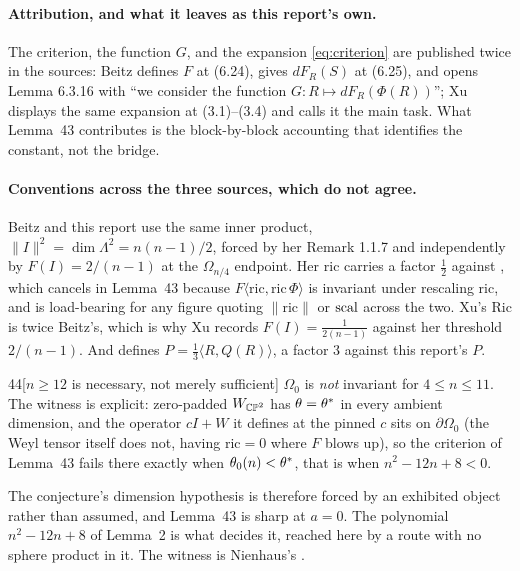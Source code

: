 \paragraph{Attribution, and what it leaves as this report's own.} The criterion, the function $G$, and the expansion \eqref{eq:criterion} are published twice in the sources: Beitz defines $F$ at (6.24), gives $dF_R(S)$ at (6.25), and opens Lemma 6.3.16 with ``we consider the function $G:R\mapsto dF_R(\Phi(R))$''; Xu displays the same expansion at (3.1)--(3.4) and calls it the main task. What Lemma~43 contributes is the block-by-block accounting that identifies the constant, not the bridge.

\paragraph{Conventions across the three sources, which do not agree.} Beitz and this report use the same inner product, $\|I\|^2=\dim\Lambda^2=n(n-1)/2$, forced by her Remark 1.1.7 and independently by $F(I)=2/(n-1)$ at the $\Omega_{n/4}$ endpoint. Her $\mathrm{ric}$ carries a factor $\tfrac12$ against \cite{bw2008}, which cancels in Lemma~43 because $F\langle\mathrm{ric},\mathrm{ric}\,\Phi\rangle$ is invariant under rescaling $\mathrm{ric}$, and is load-bearing for any figure quoting $\|\mathrm{ric}\|$ or $\mathrm{scal}$ across the two. Xu's $\mathrm{Ric}$ is twice Beitz's, which is why Xu records $F(I)=\tfrac1{2(n-1)}$ against her threshold $2/(n-1)$. And \cite{bw2008} defines $P=\tfrac13\langle R,Q(R)\rangle$, a factor $3$ against this report's $P$.

\begin{Lem}{44}[$n\ge12$ is necessary, not merely sufficient]
$\Omega_0$ is \emph{not} invariant for $4\le n\le11$. The witness is explicit: zero-padded $W_{\mathbb{CP}^2}$ has $\theta=\theta^{*}$ in every ambient dimension, and the operator $cI+W$ it defines at the pinned $c$ sits on $\partial\Omega_0$ (the Weyl tensor itself does not, having $\mathrm{ric}=0$ where $F$ blows up), so the criterion of Lemma~43 fails there exactly when $\theta_0(n)<\theta^{*}$, that is when $n^2-12n+8<0$.
\end{Lem}

\noindent The conjecture's dimension hypothesis is therefore forced by an exhibited object rather than assumed, and Lemma~43 is sharp at $a=0$. The polynomial $n^2-12n+8$ of Lemma~2 is what decides it, reached here by a route with no sphere product in it. The witness is Nienhaus's \cite{nienhaus2023}.

